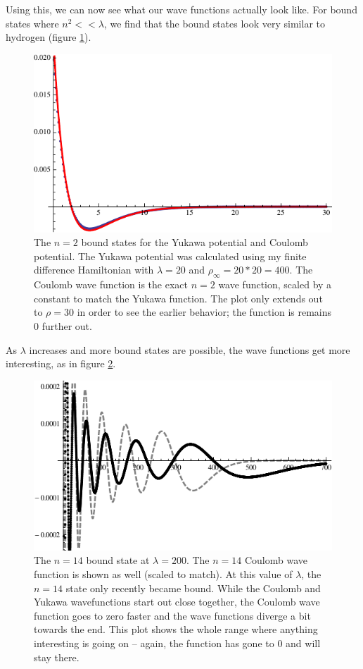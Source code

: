 \documentclass[12pt,twoside]{reedthesis}
\begin{document}
Using this, we can now see what our wave functions actually look like. For bound states where $n^2 << \lambda$, we find that the bound states look very similar to hydrogen (figure \ref{fig:hyd-yukawa}).
\begin{figure}[h]
\centering
\includegraphics{Figures/n2hydyukawa}
\caption[The $n = 2$ bound states for the Yukawa potential and Coulomb potential]{The $n = 2$ bound states for the Yukawa potential and Coulomb potential. The Yukawa potential was calculated using my finite difference Hamiltonian with $\lambda = 20$ and  $\rho_{\infty} = 20*20 = 400$. The Coulomb wave function is the exact $n=2$ wave function, scaled by a constant to match the Yukawa function. The plot only extends out to $\rho = 30$ in order to see the earlier behavior; the function is remains 0 further out.}
\label{fig:hyd-yukawa}
\end{figure}
As $\lambda$ increases and more bound states are possible, the wave functions get more interesting, as in figure \ref{fig:largebound}.
\begin{figure}[h]
\centering
\includegraphics{Figures/largebound}
\caption[The $n=14$ bound state at $\lambda = 200$]{The $n=14$ bound state at $\lambda = 200$. The $n=14$ Coulomb wave function is shown as well (scaled to match). At this value of $\lambda$, the $n=14$ state only recently became bound. While the Coulomb and Yukawa wavefunctions start out close together, the Coulomb wave function goes to zero faster and the wave functions diverge a bit towards the end. This plot shows the whole range where anything interesting is going on -- again, the function has gone to 0 and will stay there.}
\label{fig:largebound}
\end{figure}
\end{document}

